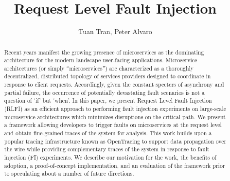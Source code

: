 \documentclass[letterpaper,twocolumn,10pt]{article}
\begin{document}
\date{}

\title{\Large \bf Request Level Fault Injection}


\author{Tuan Tran, Peter Alvaro}

\maketitle


\begin{abstract}
Recent years manifest the growing presence of microservices as the dominating architecture for the modern landscape user-facing applications. Microservice architectures (or simply ``microservices'') are characterized as a thoroughly decentralized, distributed topology of services providers designed to coordinate in response to client requests. Accordingly, given the constant specters of asynchrony and partial failure, the occurrence of potentially devastating fault scenarios is not a question of `if' but `when'. In this paper, we present Request Level Fault Injection (RLFI) as an efficient approach to performing fault injection experiments on large-scale microservice architectures which minimizes disruptions on the critical path. We present a framework allowing developers to trigger faults on microservices at the request level and obtain fine-grained traces of the system for analysis. This work builds upon a popular tracing infrastructure known as OpenTracing\cite{opentracing:doc} to support data propagation over the wire while providing complementary traces of the system in response to fault injection (FI) experiments. We describe our motivation for the work, the benefits of adoption, a proof-of-concept implementation, and an evaluation of the framework prior to speculating about a number of future directions.
\end{abstract}


\end{document}
